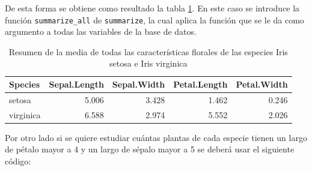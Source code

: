 \documentclass[]{book}
\newenvironment{Shaded}{\begin{snugshade}}{\end{snugshade}}
\newcommand{\DataTypeTok}[1]{\textcolor[rgb]{0.13,0.29,0.53}{#1}}
\newcommand{\DecValTok}[1]{\textcolor[rgb]{0.00,0.00,0.81}{#1}}
\newcommand{\KeywordTok}[1]{\textcolor[rgb]{0.13,0.29,0.53}{\textbf{#1}}}
\newcommand{\NormalTok}[1]{#1}
\newcommand{\OperatorTok}[1]{\textcolor[rgb]{0.81,0.36,0.00}{\textbf{#1}}}
\newcommand{\StringTok}[1]{\textcolor[rgb]{0.31,0.60,0.02}{#1}}
\begin{document}
\begin{Shaded}
\end{Shaded}

De esta forma se obtiene como resultado la tabla
\ref{tab:MenosVersicolor}. En este caso se introduce la función
\texttt{summarize\_all} de \texttt{summarize}, la cual aplica la función
que se le da como argumento a todas las variables de la base de datos.

\begin{table}

\caption{\label{tab:MenosVersicolor}Resumen de la media de todas las características florales de las especies Iris setosa e Iris virginica}
\centering
\begin{tabular}[t]{lrrrr}
\toprule
Species & Sepal.Length & Sepal.Width & Petal.Length & Petal.Width\\
\midrule
setosa & 5.006 & 3.428 & 1.462 & 0.246\\
virginica & 6.588 & 2.974 & 5.552 & 2.026\\
\bottomrule
\end{tabular}
\end{table}

Por otro lado si se quiere estudiar cuántas plantas de cada especie
tienen un largo de pétalo mayor a 4 y un largo de sépalo mayor a 5 se
deberá usar el siguiente código:

\begin{Shaded}
\end{Shaded}
\end{document}
